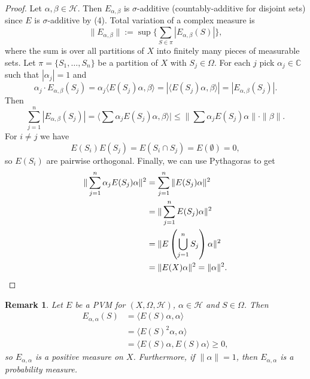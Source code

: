 \documentclass[10pt, a4paper]{article}
\newtheorem*{remark}{Remark}
\newenvironment{noticeC}{%
  \tcolorbox[%
  notitle,
  empty,
  enhanced,  %
  breakable,
  coltext=black, 
  fontupper=\rmfamily,
  noparskip,
  sharp corners,
  boxrule=-1pt,  %
  frame hidden,
  left=7pt,  %
  right=7pt,
  top=5pt,
  bottom=5pt,
  before skip=2.5ex plus 2pt,
  after skip=2.5ex plus 2pt,
  overlay unbroken and last={%
  },
  ]}
{\endtcolorbox}
\newenvironment{myproof}%
  {\begin{noticeC}\begin{proof}}%
  {\end{proof}\end{noticeC}}
\newcommand{\C}{\mathbb {C}}
\begin{document}
\begin{myproof}
  Let $\alpha, \beta \in \mathcal{H}$. Then $E_{\alpha, \beta}$ is $\sigma$-additive
  (countably-additive for disjoint sets) since $E$ is $\sigma$-additive by (4).
  Total variation of a complex measure is 
  $$\| E_{\alpha, \beta} \| := \sup \{\sum_{S \in \pi} |E_{\alpha, \beta} (S)|\},$$
  where the sum is over all partitions of $X$ into finitely many pieces of measurable sets.
  Let $\pi = \{S_1, \dots, S_n\}$ be a partition of $X$ with $S_j \in \Omega$.
  For each $j$ pick $\alpha_j \in \C$ such that $|\alpha_j| = 1$ and 
  $$\alpha_j \cdot E_{\alpha, \beta} (S_j) = \alpha_j \langle E(S_j)\alpha, \beta\rangle = |\langle E(S_j) \alpha, \beta\rangle| = |E_{\alpha, \beta} (S_j)|.$$
  Then $$\sum_{j = 1} ^n |E_{\alpha, \beta} (S_j)| = \langle \sum \alpha_j E(S_j) \alpha, \beta\rangle| \leq \| \sum \alpha_j E(S_j) \alpha\| \cdot \|\beta\|.$$
  For $i \neq j$ we have $$E(S_i) E(S_j) = E(S_i \cap S_j) = E(\emptyset) = 0,$$
  so $E(S_i)$ are pairwise orthogonal. Finally, we can use Pythagoras to get 
  \begin{align*}
    \| \sum_{j = 1} ^n \alpha_j E(S_j) \alpha\|^2 &= \sum_{j = 1} ^n \| E(S_j) \alpha\|^2\\
    &= \| \sum_{j = 1} ^n E(S_j) \alpha\|^2\\
    &= \| E\left(\bigcup_{j = 1} ^n S_j\right) \alpha\|^2\\
    &= \| E(X) \alpha\|^2 = \|\alpha \|^2. \qedhere
  \end{align*}
\end{myproof}

\begin{remark}
  Let $E$ be a PVM for $(X, \Omega, \mathcal{H})$, $\alpha \in \mathcal{H}$ and $S \in \Omega$.
  Then \begin{align*}
    E_{\alpha, \alpha} (S) &= \langle E(S) \alpha, \alpha\rangle\\
    &= \langle E(S)^2 \alpha, \alpha\rangle\\
    &= \langle E(S) \alpha, E(S) \alpha\rangle \geq 0,
  \end{align*}
  so $E_{\alpha, \alpha}$ is a positive measure on $X$.
  Furthermore, if $\|\alpha\| = 1$, then $E_{\alpha, \alpha}$ is a probability measure.
\end{remark}
\end{document}
